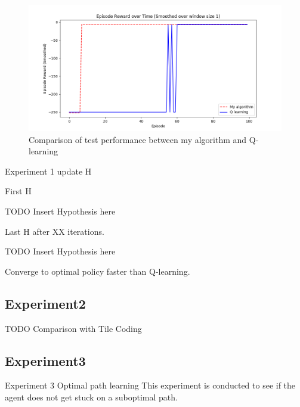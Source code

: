 \begin{figure}[!htb]
\centering
\includegraphics[width=1.0\textwidth]{./figures/experiment1_test}
\caption{Comparison of test performance between my algorithm and Q-learning}
\label{experiment1_test}
\end{figure}
    

Experiment 1 update H

First H

TODO Insert Hypothesis here

Last H after XX iterations. 

TODO Insert Hypothesis here


Converge to optimal policy faster than Q-learning.


\subsection{Experiment2}

TODO Comparison with Tile Coding
\newpage

\subsection{Experiment3}
Experiment 3 Optimal path learning
This experiment is conducted to see if the agent does not get stuck on a suboptimal path. 

